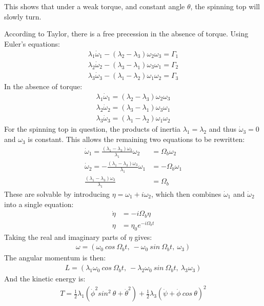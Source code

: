 \documentclass[a4paper,12pt]{article}
\begin{document}
This shows that under a weak torque, and constant angle $\theta$, the spinning top will slowly turn.

According to Taylor, there is a free precession in the absence of torque.  Using Euler's equations:
\begin{align*}
\lambda_1\dot\omega_1-(\lambda_2-\lambda_3)\omega_2\omega_3=\Gamma_1\\
\lambda_2\dot\omega_2-(\lambda_3-\lambda_1)\omega_3\omega_1=\Gamma_2\\
\lambda_3\dot\omega_3-(\lambda_1-\lambda_2)\omega_1\omega_2=\Gamma_3
\end{align*}
In the absence of torque:
\begin{align*}
\lambda_1\dot\omega_1=(\lambda_2-\lambda_3)\omega_2\omega_3\\
\lambda_2\dot\omega_2=(\lambda_3-\lambda_1)\omega_3\omega_1\\
\lambda_3\dot\omega_3=(\lambda_1-\lambda_2)\omega_1\omega_2
\end{align*}
For the spinning top in question, the products of inertia $\lambda_1=\lambda_2$ and thus $\dot\omega_3=0$ and $\omega_3$ is constant.  This allows the remaining two equations to be rewritten:
\begin{align*}
\dot\omega_1=\frac{(\lambda_1-\lambda_3)\omega_3}{\lambda_1}\omega_2&=\Omega_b\omega_2\\
\dot\omega_2=-\frac{(\lambda_1-\lambda_3)\omega_3}{\lambda_1}\omega_1&=-\Omega_b\omega_1\\
\frac{(\lambda_1-\lambda_3)\omega_3}{\lambda_1}&=\Omega_b
\end{align*}
These are solvable by introducing $\eta=\omega_1+i\omega_2$, which then combines $\dot\omega_1$ and $\dot\omega_2$ into a single equation:
\begin{align*}
\dot\eta&=-i\Omega_b\eta\\
\eta&=\eta_0e^{-i\Omega_bt}
\end{align*}
Taking the real and imaginary parts of $\eta$ gives:
\begin{align*}
\omega=(\omega_0\ cos\ \Omega_bt,\ -\omega_0\ sin\ \Omega_bt,\ \omega_3)
\end{align*}
The angular momentum is then:
\begin{align*}
L=(\lambda_1\omega_0\ cos\ \Omega_bt,\ -\lambda_2\omega_0\ sin\ \Omega_bt,\ \lambda_3\omega_3)
\end{align*}
And the kinetic energy is:
\begin{align*}
T=\frac{1}{2}\lambda_1(\dot\phi^2sin^2\ \theta+\dot\theta^2)+\frac{1}{2}\lambda_3(\dot\psi+\dot\phi\ cos\ \theta)^2
\end{align*}
\end{document}
